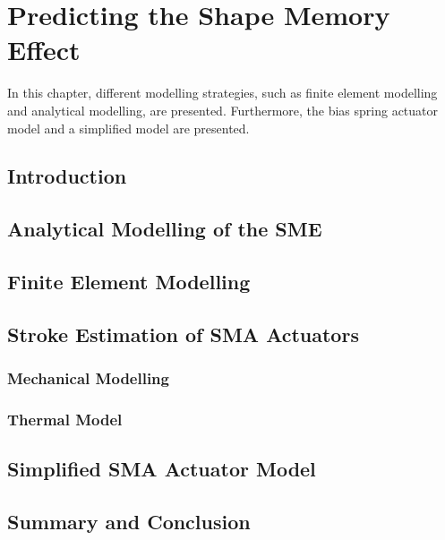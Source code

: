 
\chapter{Predicting the Shape Memory Effect}
In this chapter, different modelling strategies, such as finite element modelling and analytical modelling, are presented. Furthermore, the bias spring actuator model and a simplified model are presented.
\section{Introduction}
\section{Analytical Modelling of the SME}
\section{Finite Element Modelling}
\section{Stroke Estimation of SMA Actuators}
\subsection{Mechanical Modelling}
\subsection{Thermal Model}
\section{Simplified SMA Actuator Model}
\section{Summary and Conclusion}
